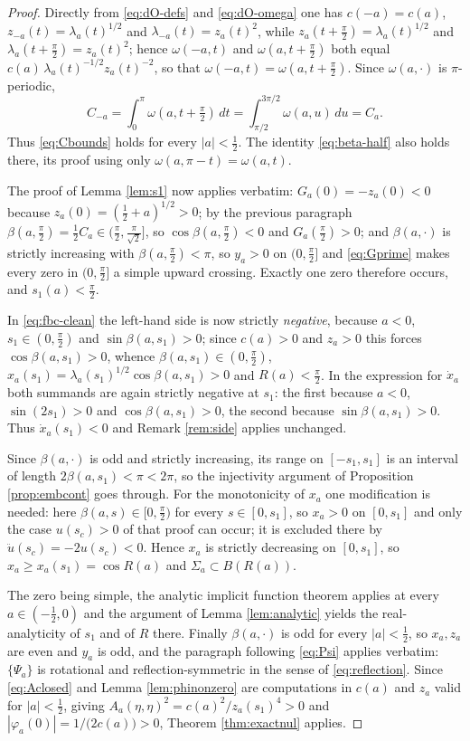 \documentclass[11pt,a4paper]{amsart}
\theoremstyle{plain}
\theoremstyle{definition}
\begin{document}
\begin{proof}
Directly from \eqref{eq:dO-defs} and \eqref{eq:dO-omega} one has $c(-a)=c(a)$, $z_{-a}(t)=\lambda_a(t)^{1/2}$ and $\lambda_{-a}(t)=z_a(t)^2$, while $z_a(t+\tfrac\pi2)=\lambda_a(t)^{1/2}$ and $\lambda_a(t+\tfrac\pi2)=z_a(t)^2$; hence $\omega(-a,t)$ and $\omega(a,t+\tfrac\pi2)$ both equal $c(a)\,\lambda_a(t)^{-1/2}z_a(t)^{-2}$, so that
$\omega(-a,t)=\omega(a,t+\tfrac\pi2)$. Since $\omega(a,\cdot)$ is $\pi$-periodic,
\[
C_{-a}=\int_0^{\pi}\omega(a,t+\tfrac\pi2)\,dt
=\int_{\pi/2}^{3\pi/2}\omega(a,u)\,du=C_a.
\]
Thus \eqref{eq:Cbounds} holds for every $|a|<\tfrac12$. The identity \eqref{eq:beta-half} also holds there, its proof using only $\omega(a,\pi-t)=\omega(a,t)$.

The proof of Lemma \ref{lem:s1} now applies verbatim: $G_a(0)=-z_a(0)<0$ because $z_a(0)=(\tfrac12+a)^{1/2}>0$; by the previous paragraph $\beta(a,\tfrac\pi2)=\tfrac12C_a\in(\tfrac\pi2,\tfrac{\pi}{\sqrt2}]$, so $\cos\beta(a,\tfrac\pi2)<0$ and $G_a(\tfrac\pi2)>0$; and $\beta(a,\cdot)$ is
strictly increasing with $\beta(a,\tfrac\pi2)<\pi$, so $y_a>0$ on $(0,\tfrac\pi2]$ and \eqref{eq:Gprime} makes every zero in $(0,\tfrac\pi2]$ a simple upward crossing. Exactly one zero therefore occurs, and $s_1(a)<\tfrac\pi2$.

In \eqref{eq:fbc-clean} the left-hand side is now strictly \emph{negative}, because $a<0$, $s_1\in(0,\tfrac\pi2)$ and $\sin\beta(a,s_1)>0$; since $c(a)>0$ and $z_a>0$ this forces $\cos\beta(a,s_1)>0$, whence $\beta(a,s_1)\in(0,\tfrac\pi2)$,
$x_a(s_1)=\lambda_a(s_1)^{1/2}\cos\beta(a,s_1)>0$ and $R(a)<\tfrac\pi2$. In the expression for $\dot x_a$ both summands are again strictly negative at $s_1$: the first because $a<0$, $\sin(2s_1)>0$ and $\cos\beta(a,s_1)>0$, the second
because $\sin\beta(a,s_1)>0$. Thus $\dot x_a(s_1)<0$ and
Remark \ref{rem:side} applies unchanged.

Since $\beta(a,\cdot)$ is odd and strictly increasing, its range on $[-s_1,s_1]$ is an interval of length $2\beta(a,s_1)<\pi<2\pi$, so the injectivity argument of Proposition \ref{prop:embcont} goes through. For the
monotonicity of $x_a$ one modification is needed: here
$\beta(a,s)\in[0,\tfrac\pi2)$ for every $s\in[0,s_1]$, so $x_a>0$ on $[0,s_1]$ and only the case $u(s_c)>0$ of that proof can occur; it is excluded there by $\ddot u(s_c)=-2u(s_c)<0$. Hence $x_a$ is strictly decreasing on $[0,s_1]$, so $x_a\geq x_a(s_1)=\cos R(a)$ and $\Sigma_a\subset B(R(a))$.

The zero being simple, the analytic implicit function theorem applies at every $a\in(-\tfrac12,0)$ and the argument of Lemma \ref{lem:analytic} yields the real-analyticity of $s_1$ and of $R$ there. Finally $\beta(a,\cdot)$ is odd for
every $|a|<\tfrac12$, so $x_a,z_a$ are even and $y_a$ is odd, and the paragraph following \eqref{eq:Psi} applies verbatim: $\{\Psi_a\}$ is rotational and reflection-symmetric in the sense of \eqref{eq:reflection}. Since \eqref{eq:Aclosed} and Lemma \ref{lem:phinonzero} are computations in $c(a)$
and $z_a$ valid for $|a|<\tfrac12$, giving $A_a(\eta,\eta)^2=c(a)^2/z_a(s_1)^4>0$
and $|\varphi_a(0)|=1/\bigl(2c(a)\bigr)>0$, Theorem \ref{thm:exactnul} applies.
\end{proof}
\end{document}
